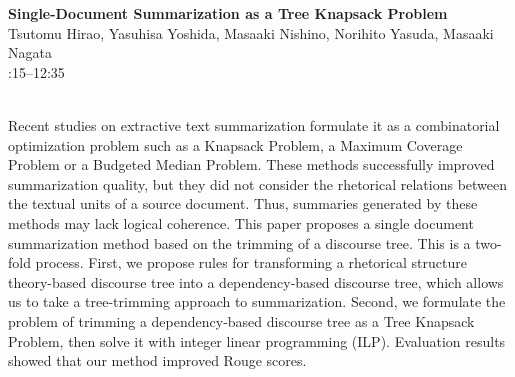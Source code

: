 \documentclass[twoside,makeidx]{book}
\renewcommand{\normalsize}{\fontsize{8}{9}\selectfont}
\renewcommand{\small}{\fontsize{7}{8}\selectfont}
\begin{document}
\par\vspace{2em}\noindent%
\begin{minipage}{\linewidth}%
\begin{center}
\textbf{\normalsize Single-Document Summarization as a Tree Knapsack Problem}\\
\normalsize  Tsutomu Hirao,  Yasuhisa Yoshida,  Masaaki Nishino,  Norihito Yasuda,  Masaaki Nagata\\
{\small 12:15--12:35}\\
\end{center}
\end{minipage}\\[0.5em]
\nopagebreak%
\noindent%
{\small Recent studies on extractive text summarization formulate it as a  combinatorial optimization problem such as a Knapsack Problem, a Maximum  Coverage Problem or a Budgeted Median Problem. These methods successfully improved summarization quality, but they did not consider the rhetorical relations  between the textual units of a source document. Thus, summaries generated by these methods may lack logical coherence. This paper proposes a single document summarization method based on the trimming of a discourse tree.  This is a two-fold process. First, we propose rules for transforming a rhetorical structure theory-based discourse tree into a dependency-based discourse tree, which allows us to take a tree-trimming approach to summarization. Second, we formulate the problem of trimming a dependency-based discourse tree as a Tree Knapsack Problem, then solve it with integer linear programming (ILP). Evaluation results showed that our method improved Rouge scores.}
\clearpage
\end{document}
